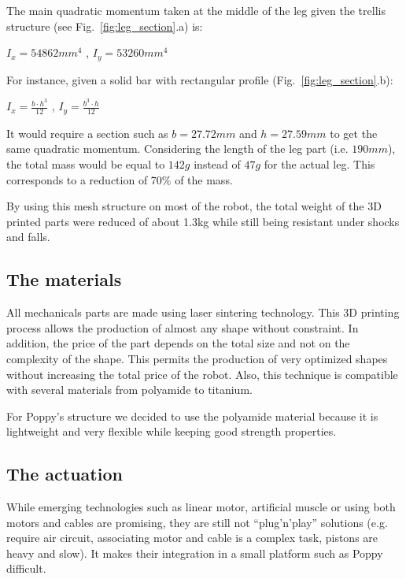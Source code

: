 The main quadratic momentum taken at the middle of the leg given the trellis structure (see Fig.~\ref{fig:leg_section}.a) is:

\begin{center}
    $I_x = 54862 mm^4$
    ,
    $I_y = 53260 mm^4$
\end{center}

For instance, given a solid bar with rectangular profile (Fig.~\ref{fig:leg_section}.b):

{\centering
    $I_x = \frac{b \cdot h^3}{12}$
    ,
    $I_y = \frac{b^3 \cdot h}{12}$

}
It would require a section such as $b=27.72 mm$ and $h=27.59 mm$ to get the same quadratic momentum. Considering the length of the leg part (i.e. $190 mm$), the total mass would be equal to $142 g$ instead of $47 g$ for the actual leg. This corresponds to a reduction of 70\% of the mass.

By using this mesh structure on most of the robot, the total weight of the 3D
printed parts were reduced of about 1.3kg while still being resistant under shocks and falls.


\subsection{The materials} %
All mechanicals parts are made using laser sintering technology. This 3D printing process allows the production of almost any shape without constraint. In addition, the price of the part depends on the total size and not on the complexity of the shape. This permits the production of very optimized shapes without increasing the total price of the robot. Also, this technique is compatible with several materials from polyamide to titanium.

For Poppy's structure we decided to use the polyamide material because it is lightweight and very flexible while keeping good strength properties.

\subsection{The actuation} %

While emerging technologies such as linear motor, artificial muscle or using both motors and cables are promising, they are still not ``plug'n'play'' solutions (e.g. require air circuit, associating motor and cable is a complex task, pistons are heavy and slow). It makes their integration in a small platform such as Poppy difficult.

